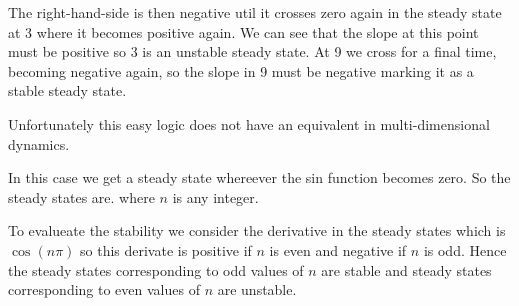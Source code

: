 The right-hand-side is then negative util it crosses zero again in the steady state at 3 where it becomes positive again. We can see that the slope at this point must be positive so 3 is an unstable steady state. At 9 we cross for a final time, becoming negative again, so the slope in 9 must be negative marking it as a stable steady state. 

Unfortunately this easy logic does not have an equivalent in multi-dimensional dynamics. 

\subquestion
{}

\solution
In this case we get a steady state whereever the sin function becomes zero. So the steady states are.  
where $n$ is any integer. 

To evalueate the stability we consider the derivative in the steady states which is $\cos(n\pi)$ so this derivate is positive if $n$ is even and negative if $n$ is odd. Hence the steady states corresponding to odd values of $n$ are stable and steady states corresponding to even values of $n$ are unstable. 


